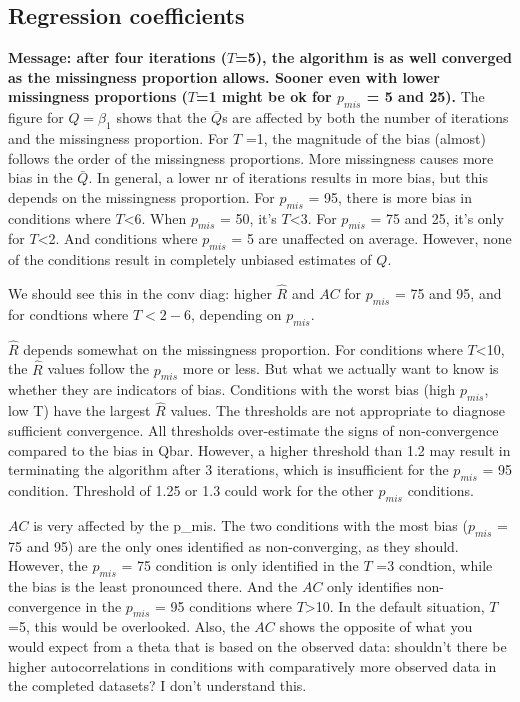 \documentclass[Royal,times,sageh]{sagej}
\begin{document}
\hypertarget{regression-coefficients}{%
\subsection{Regression coefficients}\label{regression-coefficients}}

\textbf{Message: after four iterations (\(T\)=5), the algorithm is as
well converged as the missingness proportion allows. Sooner even with
lower missingness proportions (\(T\)=1 might be ok for \(p_{mis}\) = 5
and 25).} The figure for \(Q=\beta_1\) shows that the \(\bar{Q}\)s are
affected by both the number of iterations and the missingness
proportion. For \(T\) =1, the magnitude of the bias (almost) follows the
order of the missingness proportions. More missingness causes more bias
in the \(\bar{Q}\). In general, a lower nr of iterations results in more
bias, but this depends on the missingness proportion. For \(p_{mis}\) =
95, there is more bias in conditions where \(T\)\textless6. When
\(p_{mis}\) = 50, it's \(T\)\textless3. For \(p_{mis}\) = 75 and 25,
it's only for \(T\)\textless2. And conditions where \(p_{mis}\) = 5 are
unaffected on average. However, none of the conditions result in
completely unbiased estimates of \(Q\).

We should see this in the conv diag: higher \(\widehat{R}\) and \(AC\)
for \(p_{mis}\) = 75 and 95, and for condtions where \(T<2-6\),
depending on \(p_{mis}\).

\(\widehat{R}\) depends somewhat on the missingness proportion. For
conditions where \(T\)\textless10, the \(\widehat{R}\) values follow the
\(p_{mis}\) more or less. But what we actually want to know is whether
they are indicators of bias. Conditions with the worst bias (high
\(p_{mis}\), low T) have the largest \(\widehat{R}\) values. The
thresholds are not appropriate to diagnose sufficient convergence. All
thresholds over-estimate the signs of non-convergence compared to the
bias in Qbar. However, a higher threshold than 1.2 may result in
terminating the algorithm after 3 iterations, which is insufficient for
the \(p_{mis}\) = 95 condition. Threshold of 1.25 or 1.3 could work for
the other \(p_{mis}\) conditions.

\(AC\) is very affected by the p\_mis. The two conditions with the most
bias (\(p_{mis}\) = 75 and 95) are the only ones identified as
non-converging, as they should. However, the \(p_{mis}\) = 75 condition
is only identified in the \(T\) =3 condtion, while the bias is the least
pronounced there. And the \(AC\) only identifies non-convergence in the
\(p_{mis}\) = 95 conditions where \(T\)\textgreater10. In the default
situation, \(T\) =5, this would be overlooked. Also, the \(AC\) shows
the opposite of what you would expect from a theta that is based on the
observed data: shouldn't there be higher autocorrelations in conditions
with comparatively more observed data in the completed datasets? I don't
understand this.
\end{document}

